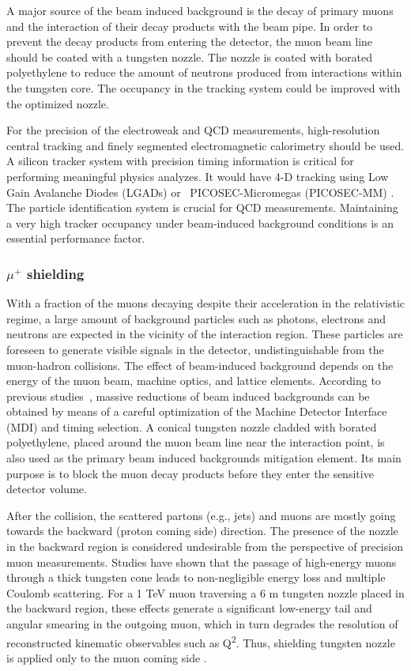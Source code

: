 A major source of the beam induced background is the decay of primary muons and the interaction of their decay products with the beam pipe.
In order to prevent the decay products from entering the detector, the muon beam line should be coated with a tungsten nozzle. The nozzle is coated with borated polyethylene to reduce the amount of neutrons produced from interactions within the tungsten core. The occupancy in the tracking system could be improved with the optimized nozzle.

For the precision of the electroweak and QCD measurements, high-resolution central tracking and finely segmented electromagnetic calorimetry should be used. A silicon tracker system with precision timing information is critical for performing meaningful physics analyzes. It would have 4-D tracking using Low Gain Avalanche Diodes (LGADs) or  PICOSEC-Micromegas (PICOSEC-MM) \cite{Malberti:2026}. The particle identification system is crucial for QCD measurements. Maintaining a very high tracker occupancy under beam-induced background conditions is an essential performance factor.

\subsubsection{\texorpdfstring{$\mu^+$}{Muon} shielding}

With a fraction of the muons decaying despite their acceleration in the relativistic regime, a large amount of background particles such as photons, electrons and neutrons are expected in the vicinity of the interaction region.
These particles are foreseen to generate visible signals in the detector, undistinguishable from the muon-hadron collisions.
The effect of beam-induced background depends on the energy of the muon beam, machine optics, and lattice elements.
According to previous studies~\cite{Collamati:2021,Bell:2025}, massive reductions of beam induced backgrounds can be obtained by means of a careful optimization of the Machine Detector Interface (MDI) and timing selection.
A conical tungsten nozzle cladded with borated polyethylene, placed around the muon beam line near the interaction point, is also used as the primary beam induced backgrounds mitigation element.
Its main purpose is to block the muon decay products before they enter the sensitive detector volume. 

After the collision, the scattered partons (e.g., jets) and muons are mostly going towards the backward (proton coming side) direction. The presence of the nozzle in the backward region is considered undesirable from the perspective of precision muon measurements.
Studies have shown that the passage of high-energy muons through a thick tungsten cone leads to non-negligible energy loss and multiple Coulomb scattering.
For a 1 TeV muon traversing a 6 m tungsten nozzle placed in the backward region, these effects generate a significant low-energy tail and angular smearing in the outgoing muon, which in turn degrades the resolution of reconstructed kinematic observables such as Q\textsuperscript{2}. Thus, shielding tungsten nozzle is applied only to the muon coming side \cite{Acosta:2023,Akturk:2025ubm}.

